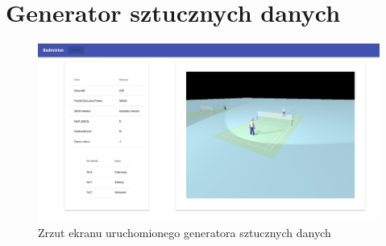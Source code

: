 \section{Generator sztucznych danych}

\begin{figure}[!htb]
  \includegraphics[width=\linewidth]{./generator_1.png}
    \caption{Zrzut ekranu uruchomionego generatora sztucznych danych}
\end{figure}
